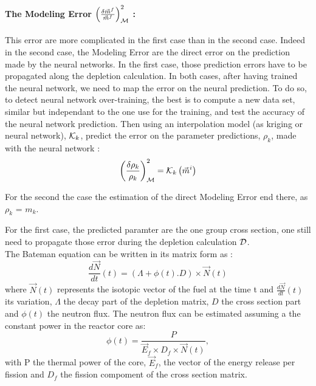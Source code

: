 \documentclass[dvips,12pt]{article}
\begin{document}
\paragraph{The Modeling Error $\left( \frac{\delta \vec{m}^{f}}{\vec{m}^{f}} \right)^{2} _{{\cal M}}$ : \\}
This error are more complicated in the first case
than in the second case. Indeed in the second case,
the Modeling Error are the direct error on the
prediction made by the neural networks.
In the first case, those prediction errors have to
be propagated along the depletion calculation.
In both cases, after having trained the neural
network, we need to map the error on the neural
prediction.
To do so, to detect neural network over-training,
the best is to compute a new data set, similar but
independant to the one use for the training, and
test the accuracy of the neural network prediction.
Then using an interpolation model (as kriging or
neural network), ${\cal K}_k$,  predict the error
on the parameter predictions, $\rho_k$, made with
the neural network :
\begin{equation}
  \left( \frac{\delta \rho_k}{\rho_k} \right)^{2} _{{\cal M}} = {\cal K}_k \left( \vec{m}^{i} \right)
\end{equation}

For the second the case the estimation of the
direct Modeling Error end there, as $\rho_k$ = $m_k$.

For the first case, the predicted paramter are the
one group cross section, one still need to
propagate those error during the depletion
calculation ${\cal D}$.\\
The Bateman equation can be written in its matrix
form as :
\begin{equation}
  \frac{d\vec{N}}{dt}(t) = (\Lambda + \phi(t) . D) \times \vec{N}(t)
\end{equation}
where $\vec{N}(t)$ represents the isotopic vector
of the fuel at the time t and
$\frac{d\vec{N}}{dt}(t)$ its variation, $\Lambda$
the decay part of the depletion matrix, $D$ the
cross section part and $\phi(t)$ the neutron flux.
The neutron flux can be estimated assuming a the
constant power in the reactor core as:
\begin{equation}
  \phi(t) = \frac{P}{ \vec{E}_f \times D_f \times \vec{N}(t)},
\end{equation}
with P the thermal power of the core, $\vec{E}_f$,
the vector of the energy release per fission and
$D_f$ the fission compoment of the cross section
matrix.
\end{document}
